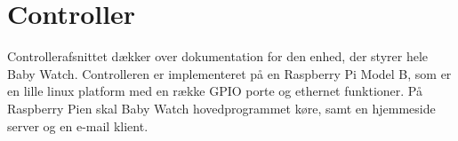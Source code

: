 \chapter{Controller}

Controllerafsnittet dækker over dokumentation for den enhed, der styrer hele Baby Watch. Controlleren er implementeret på en Raspberry Pi Model B, som er en lille linux platform med en række GPIO porte og ethernet funktioner. På Raspberry Pien skal Baby Watch hovedprogrammet køre, samt en hjemmeside server og en e-mail klient.





